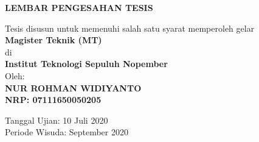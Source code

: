 \AddToShipoutPicture*{\BackgroundImage}

\begin{center}
	\large\textbf{LEMBAR PENGESAHAN TESIS}
\end{center}

\begin{center}
	Tesis disusun untuk memenuhi salah satu syarat memperoleh gelar\\
	\textbf{Magister Teknik (MT)}\\
	di\\
	\textbf{Institut Teknologi Sepuluh Nopember}\\
	Oleh:\\
	\textbf{NUR ROHMAN WIDIYANTO}\\
	\textbf{NRP: 07111650050205}
\end{center}

\begin{center}
	Tanggal Ujian: 10 Juli 2020\\
	Periode Wisuda: September 2020
\end{center}

